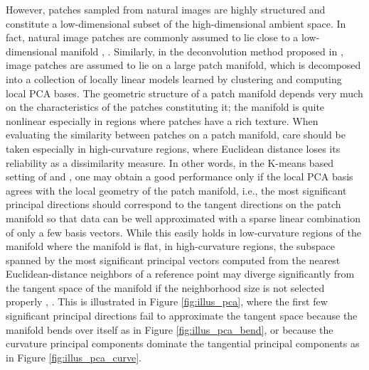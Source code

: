 \documentclass[journal]{IEEEtran}
\begin{document}
However, patches sampled from natural images are highly structured and constitute a low-dimensional subset of the high-dimensional ambient space. In fact, natural image patches are commonly assumed to lie close to a low-dimensional manifold \cite{Lee03the}, \cite{Peyre09manifold}. Similarly, in the deconvolution method proposed in \cite{Ni11example}, image patches are assumed to lie on a large patch manifold, which is decomposed into a collection of locally linear models learned by clustering and computing local PCA bases. The geometric structure of a patch manifold depends very much on the characteristics of the patches constituting it; the manifold is quite nonlinear especially in regions where patches have a rich texture. When evaluating the similarity between patches on a patch manifold, care should be taken especially in high-curvature regions, where Euclidean distance loses its reliability as a dissimilarity measure. 
In other words, in the K-means based setting of \cite{Dong13nonlocally} and  \cite{Dong11image}, one may obtain a good performance only if the local PCA basis agrees with the local geometry of the patch manifold, i.e., the most significant principal directions should correspond to the tangent directions on the patch manifold so that data can be well approximated with a sparse linear combination of only a few basis vectors. While this easily holds in low-curvature regions of the manifold where the manifold is flat, in high-curvature regions, the subspace spanned by the most significant principal vectors computed from the nearest Euclidean-distance neighbors of a reference point may diverge significantly from the tangent space of the manifold if the neighborhood size is not selected properly \cite{Kaslovsky12overcoming}, \cite{Tyagi13tangent}. This is illustrated in Figure \ref{fig:illus_pca}, where the first few significant principal directions fail to approximate the tangent space because the manifold bends over itself as in Figure \ref{fig:illus_pca_bend}, or because the curvature principal components dominate the tangential principal components as in Figure \ref{fig:illus_pca_curve}.
\begin{figure*}[!t]
\begin{center}
 \end{center}
 \caption{PCA basis vectors computed with data sampled from a neighborhood on a manifold. In (a), the two most significant principal directions correspond to tangent directions and PCA computes a local model coherent with the manifold geometry. In (b), PCA fails to recover the tangent space as the manifold bends over itself and the neighborhood size is not selected properly. In (c), as the curvature component is stronger than the tangential components, the subspace spanned by the two most significant PCA basis vectors again fails to approximate the tangent space.}
 \label{fig:illus_pca}
\end{figure*}
\end{document}
